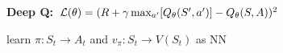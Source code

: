 \textbf{Deep Q:} $\mathcal{L}(\theta) = (R + \gamma \max_{a'}[Q_\theta(S', a')] - Q_\theta(S,A))^2$\\

learn $\pi: S_t \rightarrow A_t$ and $v_\pi: S_t \rightarrow V(S_t)$ as NN\\

